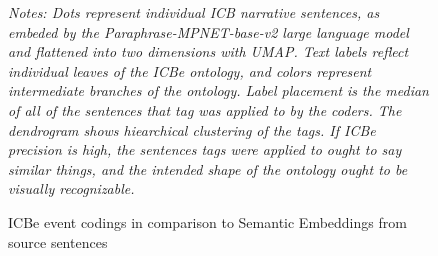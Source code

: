 \documentclass{article}
\begin{document}
\begin{figure}[H]
\caption{ICBe event codings in comparison to Semantic Embeddings from source sentences\label{fig:semantic_embeddings}}
\textit{Notes: Dots represent individual ICB narrative sentences, as embeded by the Paraphrase-MPNET-base-v2 large language model and flattened into two dimensions with UMAP. Text labels reflect individual leaves of the ICBe ontology, and colors represent intermediate branches of the ontology. Label placement is the median of all of the sentences that tag was applied to by the coders. The dendrogram shows hiearchical clustering of the tags. If ICBe precision is high, the sentences tags were applied to ought to say similar things, and the intended shape of the ontology ought to be visually recognizable. }
\end{figure}
\clearpage

\clearpage
\end{document}
